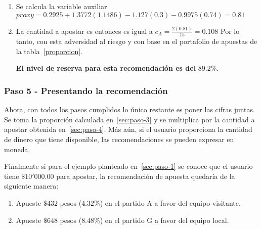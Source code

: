 \begin{enumerate}
\begin{enumerate}
		\item Se calcula la variable auxiliar $proxy = 0.2925 + 1.3772(1.1486) -1.127(0.3) - 0.9975(0.74) = 0.81$
		
		\item La cantidad a apostar es entonces es igual a $c_A = \frac{2(0.81)}{15} = 0.108$
		Por lo tanto, con esta adversidad al riesgo y con base en el portafolio de apuestas de la tabla~\ref{proporcion}.
		
		\textbf{El nivel de reserva para esta recomendación es del} $\mathbf{89.2\%}$.
	\end{enumerate}
\end{enumerate}

\subsubsection{Paso 5 - Presentando la recomendación}
\label{sec:paso-5}
Ahora, con todos los pasos cumplidos lo único restante es poner las cifras juntas. Se toma la proporción calculada en~\ref{sec:paso-3} y se multiplica por la cantidad a apostar obtenida en~\ref{sec:paso-4}.
Más aún, si el usuario proporciona la cantidad de dinero que tiene disponible, las recomendaciones se pueden expresar en moneda.

Finalmente si para el ejemplo planteado en~\ref{sec:paso-1} se conoce que el usuario tiene $\$10'000.00$ para apostar, la recomendación de apuesta quedaría de la siguiente manera:
\begin{enumerate}
	\item Apueste $\$432$ pesos ($4.32\%$) en el partido A a favor del equipo visitante.
	\item Apueste $\$648$ pesos ($8.48\%$) en el partido G a favor del equipo local.
\end{enumerate}


